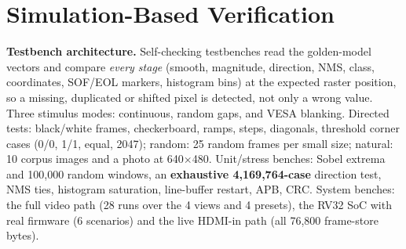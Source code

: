 \documentclass[11pt,a4paper]{article}
\begin{document}
\section{Simulation-Based Verification}
\label{sec:sim}
\textbf{Testbench architecture.} Self-checking testbenches read the golden-model vectors and compare \emph{every stage}
(smooth, magnitude, direction, NMS, class, coordinates, SOF/EOL markers, histogram bins) at the expected raster position, so a
missing, duplicated or shifted pixel is detected, not only a wrong value. Three stimulus modes: continuous, random gaps, and
VESA blanking. Directed tests: black/white frames, checkerboard, ramps, steps, diagonals, threshold corner cases (0/0, 1/1,
equal, 2047); random: 25 random frames per small size; natural: 10 corpus images and a photo at 640$\times$480.
Unit/stress benches: Sobel extrema and 100{,}000 random windows, an \textbf{exhaustive 4{,}169{,}764-case} direction test, NMS ties,
histogram saturation, line-buffer restart, APB, CRC. System benches: the full video path (28 runs over the 4 views and 4 presets), the
RV32 SoC with real firmware (6 scenarios) and the live HDMI-in path (all 76{,}800 frame-store bytes).
\end{document}
